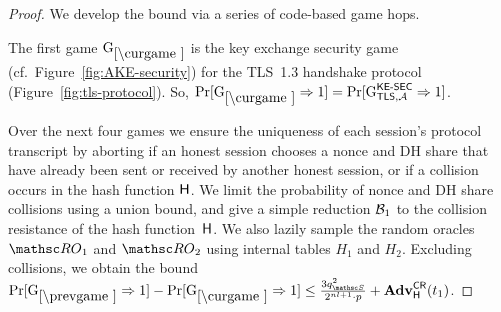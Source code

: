 \begin{proof}
	\let\proofsep\medskip %
	
	
	We develop the bound via a series of code-based game hops.
	
	
	The first game $\curGm$ is the key exchange security game (cf.\ Figure~\ref{fig:AKE-security}) for the TLS~1.3 handshake protocol (Figure~\ref{fig:tls-protocol}).
	So,
	$\Pr[\curGm*\Rightarrow 1] = \Pr[ \Gm^{\KESEC}_{\TLS,\advA} \Rightarrow 1 ]$.
	
	
	
	Over the next four games we ensure the uniqueness of each session's protocol transcript by aborting if an honest session chooses a nonce and DH share that have already been sent or received by another honest session, or if a collision occurs in the hash function $\mathsf{H}$. We limit the probability of nonce and DH share collisions using a union bound, and give a simple reduction $\mathcal{B}_1$ to the collision resistance of the hash function~$\mathsf{H}$. We also lazily sample the random oracles $\RO_1$ and $\RO_2$ using internal tables $H_1$ and $H_2$.
	Excluding collisions, we obtain the bound
	$\Pr[\prevGm*\Rightarrow 1] - \Pr[\curGm\Rightarrow 1] \leq \frac{3\qSend^2}{2^{\nl+1}\cdot p}%
	+ \Adv^{\COLL}_{\Hash}(t_1)$.
	

\end{proof}
